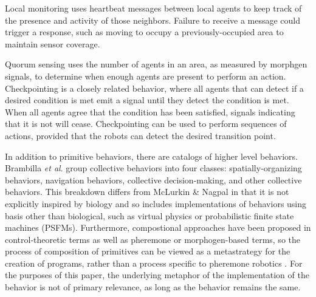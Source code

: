 \documentclass[]{article}
\begin{document}
Local monitoring uses heartbeat messages between local agents to keep track of the presence and activity of those neighbors. Failure to receive a message could trigger a response, such as moving to occupy a previously-occupied area to maintain sensor coverage.

Quorum sensing uses the number of agents in an area, as measured by morphgen signals, to determine when enough agents are present to perform an action. 
Checkpointing is a closely related behavior, where all agents that can detect if a desired condition is met emit a signal until they detect the condition is met. 
When all agents agree that the condition has been satisfied, signals indicating that it is not will cease. 
Checkpointing can be used to perform sequences of actions, provided that the robots can detect the desired transition point. 

In addition to primitive behaviors, there are catalogs of higher level behaviors. 
Brambilla \textit{et al}. group collective behaviors into four classes: spatially-organizing behaviors, navigation behaviors, collective decision-making, and other collective behaviors.
This breakdown differs from McLurkin \& Nagpal in that it is not explicitly inspired by biology and so includes implementations of behaviors using basis other than biological, such as virtual physics or probabilistic finite state machines (PSFMs). 
Furthermore, compostional approaches have been proposed in control-theoretic terms as well as pheremone or morphogen-based terms, so the process of composition of primitives can be viewed as a metastrategy for the creation of programs, rather than a process specific to pheremone robotics \cite{belta2007symbolic}.
For the purposes of this paper, the underlying metaphor of the implementation of the behavior is not of primary relevance, as long as the behavior remains the same. 
\end{document}
